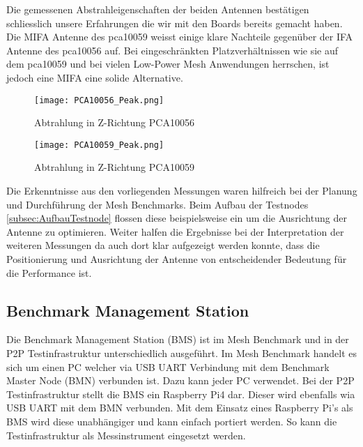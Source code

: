 Die gemessenen Abstrahleigenschaften der beiden Antennen bestätigen schliesslich unsere Erfahrungen die wir mit den Boards bereits gemacht haben. Die MIFA Antenne des pca10059 weisst einige klare Nachteile gegenüber der IFA Antenne des pca10056 auf. Bei eingeschränkten Platzverhältnissen wie sie auf dem pca10059 und bei vielen Low-Power Mesh Anwendungen herrschen, ist jedoch eine MIFA eine solide Alternative.

\begin{figure}[!htbp]
\centering
\begin{minipage}[b][]{0.49\linewidth}
	\centering
	\texttt{[image: PCA10056\_Peak.png]}
	\caption{Abtrahlung in Z-Richtung PCA10056}
	\label{fig:PCA10056Peak}
\end{minipage}
\begin{minipage}[b]{0.49\linewidth}
	\centering
	\texttt{[image: PCA10059\_Peak.png]}
	\caption{Abtrahlung in Z-Richtung PCA10059}
	\label{fig:PCA10059Peak}
\end{minipage}
\end{figure}


Die Erkenntnisse aus den vorliegenden Messungen waren hilfreich bei der Planung und Durchführung der Mesh Benchmarks. Beim Aufbau der Testnodes \ref{subsec:AufbauTestnode} flossen diese beispielsweise ein um die Ausrichtung der Antenne zu optimieren. Weiter halfen die Ergebnisse bei der Interpretation der weiteren Messungen da auch dort klar aufgezeigt werden konnte, dass die Positionierung und Ausrichtung der Antenne von entscheidender Bedeutung für die Performance ist.

\subsection{Benchmark Management Station}\label{subsec:BenchmarkManagementStation}

Die Benchmark Management Station (BMS) ist im Mesh Benchmark und in der P2P Testinfrastruktur unterschiedlich ausgeführt. Im Mesh Benchmark handelt es sich um einen PC welcher via USB UART Verbindung mit dem Benchmark Master Node (BMN) verbunden ist. Dazu kann jeder PC verwendet.
Bei der P2P Testinfrastruktur stellt die BMS ein Raspberry Pi4 dar. Dieser wird ebenfalls wia USB UART mit dem BMN verbunden. Mit dem Einsatz eines Raspberry Pi's als BMS wird diese unabhängiger und kann einfach portiert werden. So kann die Testinfrastruktur als Messinstrument eingesetzt werden.
